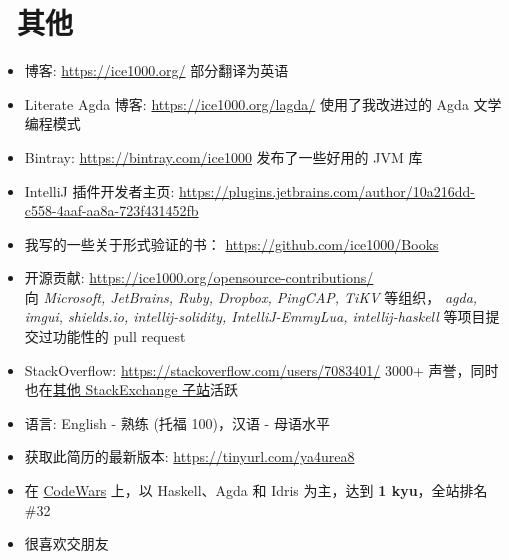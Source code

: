 \documentclass{resume}
\begin{document}

\section{\faInfo\ 其他}
\begin{itemize}[parsep=0.25ex]
  \item 博客: \url{https://ice1000.org/} 部分翻译为英语
  \item Literate Agda 博客: \url{https://ice1000.org/lagda/} 使用了我改进过的 Agda 文学编程模式
  \item Bintray: \url{https://bintray.com/ice1000} 发布了一些好用的 JVM 库
  \item IntelliJ 插件开发者主页: \url{https://plugins.jetbrains.com/author/10a216dd-c558-4aaf-aa8a-723f431452fb}
  \item 我写的一些关于形式验证的书： \url{https://github.com/ice1000/Books}
  \item 开源贡献: \url{https://ice1000.org/opensource-contributions/} \\
    向 \textit{Microsoft, JetBrains, Ruby, Dropbox, PingCAP, TiKV} 等组织，
    \textit{agda, imgui, shields.io, intellij-solidity, IntelliJ-EmmyLua,
      intellij-haskell} 等项目提交过功能性的 pull request
  \item StackOverflow: \url{https://stackoverflow.com/users/7083401/}
    3000+ 声誉，同时也在\href{https://stackexchange.com/users/9532102/} {其他 StackExchange 子站}活跃
  \item 语言: English - 熟练 (托福 100)，汉语 - 母语水平
  \item 获取此简历的最新版本: \url{https://tinyurl.com/ya4urea8}
  \item 在
    \href{https://www.codewars.com/users/ice1000} {CodeWars}
    上，以 Haskell、Agda 和 Idris 为主，达到 \textbf{1 kyu}，全站排名 \#32
  \item 很喜欢交朋友
\end{itemize}

%
%
\end{document}
